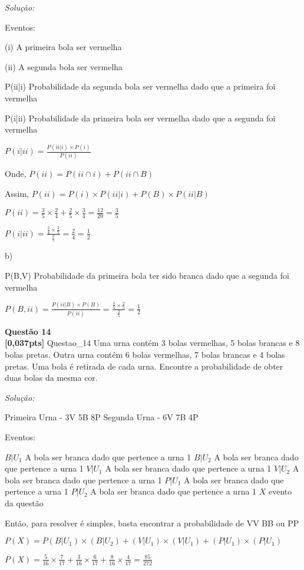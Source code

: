 \documentclass{article}
\newenvironment{problem}[2][Questão]
    { \begin{mdframed}[backgroundcolor=gray!20] \textbf{#1 #2} \\}
    {  \end{mdframed}}
\newenvironment{solution}
    {\textit{Solução:}}
    {}
\begin{document}
\begin{solution}

Eventos:

(i) A primeira bola ser vermelha

(ii) A segunda bola ser vermelha

P(ii|i) Probabilidade da segunda bola ser vermelha dado que a primeira foi vermelha

P(i|ii) Probabilidade da primeira bola ser vermelha dado que a segunda foi vermelha

$P(i|ii) = \frac{P(ii|i) \times P(i)}{P(ii)}$

Onde, $P(ii) = P(ii \cap i) + P(ii \cap B)$

Assim, $P(ii) = P(i) \times P(ii|i) + P(B) \times P(ii|B)$

$P(ii) = \frac{3}{5} \times \frac{2}{4} + \frac{2}{5} \times \frac{3}{4} = \frac{12}{20} = \frac{3}{5}$

$P(i|ii) = \frac{\frac{2}{4} \times \frac{3}{5}}{\frac{3}{5}} = \frac{2}{4} = \frac{1}{2}$

b)

P(B,V) Probabilidade da primeira bola ter sido branca dado que a segunda foi vermelha

$P(B,ii) = \frac{P(ii|B) \times P(B)}{P(ii)} = \frac{\frac{3}{4} \times \frac{2}{5}}{\frac{3}{5}} = \frac{1}{2}$

\end{solution}

\begin{problem}{14}
\textbf{[0,037pts]} Questao\_14 Uma urna contém 3 bolas vermelhas, 5 bolas brancas e 8 bolas pretas. Outra urna contém 6 bolas vermelhas, 7 bolas brancas e 4 bolas pretas. Uma bola é retirada de cada urna. Encontre a probabilidade de obter duas bolas da mesma cor.
\end{problem}

\begin{solution}

Primeira Urna - 3V 5B 8P
Segunda Urna - 6V 7B 4P

Eventos:

$B|U_{1}$ A bola ser branca dado que pertence a urna 1
$B|U_{2}$ A bola ser branca dado que pertence a urna 1
$V|U_{1}$ A bola ser branca dado que pertence a urna 1
$V|U_{2}$ A bola ser branca dado que pertence a urna 1
$P|U_{1}$ A bola ser branca dado que pertence a urna 1
$P|U_{2}$ A bola ser branca dado que pertence a urna 1
$X$ evento da questão

Então, para resolver é simples, basta encontrar a probabilidade de VV BB ou PP

$P(X) = P(B|U_{1}) \times (B|U_{2}) + (V|U_{1}) \times (V|U_{1}) + (P|U_{1}) \times (P|U_{1})$

$P(X) = \frac{5}{16} \times \frac{7}{17} + \frac{3}{16} \times \frac{6}{17} + \frac{8}{16} \times \frac{4}{17} = \frac{85}{272} $

\end{solution}
\end{document}
